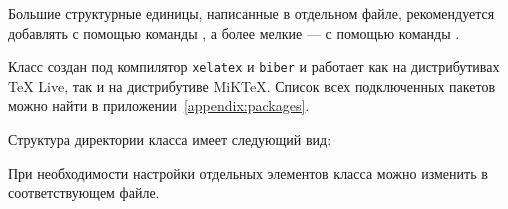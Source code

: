Большие структурные единицы, написанные в отдельном файле, рекомендуется
добавлять с помощью команды \lstinline::, а более мелкие ---
с помощью команды \lstinline::. 

Класс создан под компилятор \lstinline:xelatex: и \lstinline:biber: и работает
как на дистрибутивах TeX Live, так и на дистрибутиве MiKTeX. Список всех
подключенных пакетов можно найти в приложении~\ref{appendix:packages}.

Структура директории класса имеет следующий вид:
\vspace{0.5cm}
\begin{small}
\end{small}
\vspace{0.5cm}

При необходимости настройки отдельных элементов класса можно изменить в
соответствующем файле.